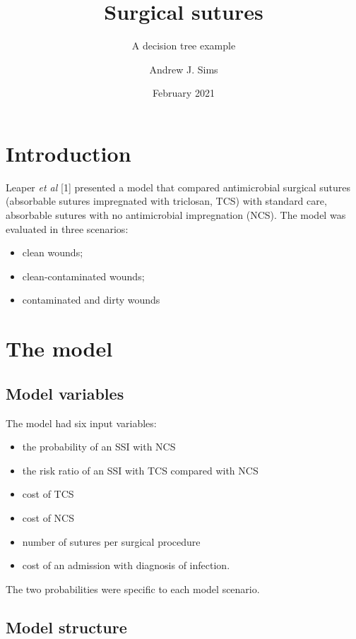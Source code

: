 \documentclass[
]{article}
\title{Surgical sutures}
\subtitle{A decision tree example}
\author{Andrew J. Sims}
\date{February 2021}
\providecommand{\tightlist}{%
  \setlength{\itemsep}{0pt}\setlength{\parskip}{0pt}}
\begin{document}
\maketitle

\hypertarget{introduction}{%
\section{Introduction}\label{introduction}}

Leaper \emph{et al} {[}1{]} presented a model that compared
antimicrobial surgical sutures (absorbable sutures impregnated with
triclosan, TCS) with standard care, absorbable sutures with no
antimicrobial impregnation (NCS). The model was evaluated in three
scenarios:

\begin{itemize}
\tightlist
\item
  clean wounds;
\item
  clean-contaminated wounds;
\item
  contaminated and dirty wounds
\end{itemize}

\hypertarget{the-model}{%
\section{The model}\label{the-model}}

\hypertarget{model-variables}{%
\subsection{Model variables}\label{model-variables}}

The model had six input variables:

\begin{itemize}
\tightlist
\item
  the probability of an SSI with NCS
\item
  the risk ratio of an SSI with TCS compared with NCS
\item
  cost of TCS
\item
  cost of NCS
\item
  number of sutures per surgical procedure
\item
  cost of an admission with diagnosis of infection.
\end{itemize}

The two probabilities were specific to each model scenario.

\hypertarget{model-structure}{%
\subsection{Model structure}\label{model-structure}}
\end{document}
